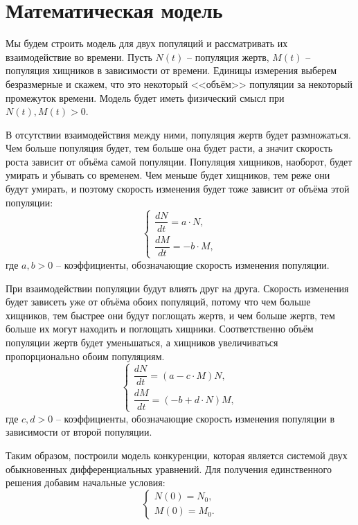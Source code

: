 \section{Математическая модель}
    Мы будем строить модель для двух популяций и рассматривать их взаимодействие во времени. Пусть $ N(t) $ -- популяция жертв, $ M(t) $ -- популяция хищников в зависимости от времени. Единицы измерения выберем безразмерные и скажем, что это некоторый <<объём>> популяции за некоторый промежуток времени. Модель будет иметь физический смысл при $ N(t), M(t) > 0 $.

    В отсутствии взаимодействия между ними, популяция жертв будет размножаться. Чем больше популяция будет, тем больше она будет расти, а значит скорость роста зависит от объёма самой популяции. Популяция хищников, наоборот, будет умирать и убывать со временем. Чем меньше будет хищников, тем реже они будут умирать, и поэтому скорость изменения будет тоже зависит от объёма этой популяции:
    \[
        \begin{cases}
            \dfrac{dN}{dt} = a \cdot N, \\[.5em]
            \dfrac{dM}{dt} = -b \cdot M,
        \end{cases}
    \]
    где $a, b > 0$ -- коэффициенты, обозначающие скорость изменения популяции.

    При взаимодействии популяции будут влиять друг на друга. Скорость изменения будет зависеть уже от объёма обоих популяций, потому что чем больше хищников, тем быстрее они будут поглощать жертв, и чем больше жертв, тем больше их могут находить и поглощать хищники. Соответственно объём популяции жертв будет уменьшаться, а хищников увеличиваться пропорционально обоим популяциям.
    \[
        \begin{cases}
            \dfrac{dN}{dt} = (a - c \cdot M) N, \\[.5em]
            \dfrac{dM}{dt} = (-b + d \cdot N) M,
        \end{cases}
    \]
    где $ c, d > 0 $ -- коэффициенты, обозначающие скорость изменения популяции в зависимости от второй популяции.

    Таким образом, построили модель конкуренции, которая является системой двух обыкновенных дифференциальных уравнений. Для получения единственного решения добавим начальные условия: 
    \[
        \begin{cases}
            N(0) = N_0, \\[.5em]
            M(0) = M_0.
        \end{cases}
    \]